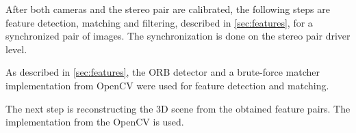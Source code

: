 After both cameras and the stereo pair are calibrated, the following steps are feature detection, matching and filtering, described in \autoref{sec:features}, for a synchronized pair of images. 
The synchronization is done on the stereo pair driver level.

As described in \autoref{sec:features}, the ORB detector and a brute-force matcher implementation from OpenCV were used for feature detection and matching.

The next step is reconstructing the 3D scene from the obtained feature pairs.
The implementation from the OpenCV is used.

